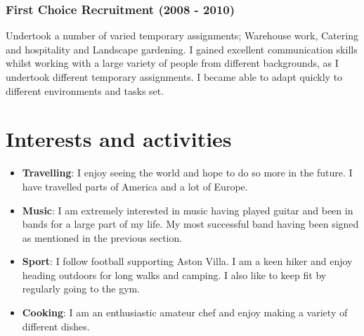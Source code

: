 \documentclass[11pt]{article}
\begin{document}
\subsubsection*{First Choice Recruitment (2008 - 2010)}
Undertook a number of varied temporary assignments; Warehouse work, Catering and hospitality and Landscape gardening. I gained excellent communication skills whilst working with a large variety of people from different backgrounds, as I undertook different temporary assignments. I became able to adapt quickly to different environments and tasks set.

\section*{Interests and activities}
\begin{itemize}
\item \textbf{Travelling}: I enjoy seeing the world and hope to do so more in the future. I have travelled parts of America and a lot of Europe.
\item \textbf{Music}: I am extremely interested in music having played guitar and been in bands for a large part of my life. My most successful band having been signed as mentioned in the previous section.
\item \textbf{Sport}: I follow football supporting Aston Villa. I am a keen hiker and enjoy heading outdoors for long walks and camping. I also like to keep fit by regularly going to the gym.
\item \textbf{Cooking}: I am an enthusiastic amateur chef and enjoy making a variety of different dishes.
\end{itemize}
\end{document}
